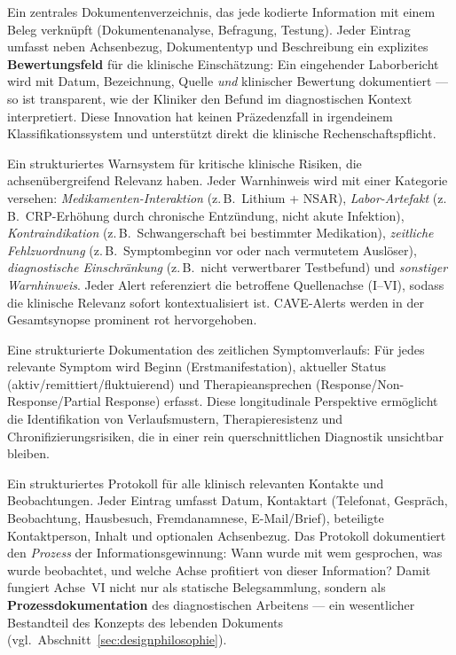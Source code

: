 \documentclass[11pt,a4paper]{article}
\begin{document}
\begin{description}[style=nextline, leftmargin=1.5cm, font=\bfseries]
\item[Evidenz-Matrix] Ein zentrales Dokumentenverzeichnis, das jede kodierte Information mit einem Beleg verkn\"upft (Dokumentenanalyse, Befragung, Testung). Jeder Eintrag umfasst neben Achsenbezug, Dokumententyp und Beschreibung ein explizites \textbf{Bewertungsfeld} f\"ur die klinische Einsch\"atzung: Ein eingehender Laborbericht wird mit Datum, Bezeichnung, Quelle \textit{und} klinischer Bewertung dokumentiert --- so ist transparent, wie der Kliniker den Befund im diagnostischen Kontext interpretiert. Diese Innovation hat keinen Pr\"azedenzfall in irgendeinem Klassifikationssystem und unterst\"utzt direkt die klinische Rechenschaftspflicht.
\item[CAVE-Warnhinweise] Ein strukturiertes Warnsystem f\"ur kritische klinische Risiken, die achsen\"ubergreifend Relevanz haben. Jeder Warnhinweis wird mit einer Kategorie versehen: \textit{Medikamenten-Interaktion} (z.\,B.\ Lithium + NSAR), \textit{Labor-Artefakt} (z.\,B.\ CRP-Erh\"ohung durch chronische Entz\"undung, nicht akute Infektion), \textit{Kontraindikation} (z.\,B.\ Schwangerschaft bei bestimmter Medikation), \textit{zeitliche Fehlzuordnung} (z.\,B.\ Symptombeginn vor oder nach vermutetem Ausl\"oser), \textit{diagnostische Einschr\"ankung} (z.\,B.\ nicht verwertbarer Testbefund) und \textit{sonstiger Warnhinweis}. Jeder Alert referenziert die betroffene Quellenachse (I--VI), sodass die klinische Relevanz sofort kontextualisiert ist. CAVE-Alerts werden in der Gesamtsynopse prominent rot hervorgehoben.
\item[Longitudinaler Symptomverlauf] Eine strukturierte Dokumentation des zeitlichen Symptomverlaufs: F\"ur jedes relevante Symptom wird Beginn (Erstmanifestation), aktueller Status (aktiv/remittiert/fluktuierend) und Therapieansprechen (Response/Non-Response/Partial Response) erfasst. Diese longitudinale Perspektive erm\"oglicht die Identifikation von Verlaufsmustern, Therapieresistenz und Chronifizierungsrisiken, die in einer rein querschnittlichen Diagnostik unsichtbar bleiben.
\item[Kontakt- und Beobachtungsprotokoll] Ein strukturiertes Protokoll f\"ur alle klinisch relevanten Kontakte und Beobachtungen. Jeder Eintrag umfasst Datum, Kontaktart (Telefonat, Gespr\"ach, Beobachtung, Hausbesuch, Fremdanamnese, E-Mail/Brief), beteiligte Kontaktperson, Inhalt und optionalen Achsenbezug. Das Protokoll dokumentiert den \textit{Prozess} der Informationsgewinnung: Wann wurde mit wem gesprochen, was wurde beobachtet, und welche Achse profitiert von dieser Information? Damit fungiert Achse~VI nicht nur als statische Belegsammlung, sondern als \textbf{Prozessdokumentation} des diagnostischen Arbeitens --- ein wesentlicher Bestandteil des Konzepts des lebenden Dokuments (vgl.\ Abschnitt~\ref{sec:designphilosophie}).
\end{description}
\end{document}
